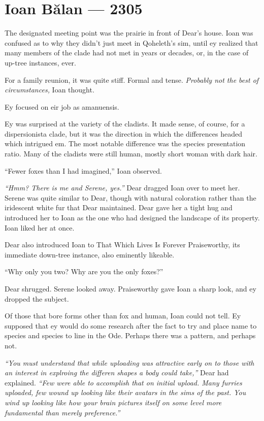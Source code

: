 \hypertarget{ioan-bux103lan-2305}{%
\chapter*{Ioan Bălan — 2305}\label{ioan-bux103lan-2305}}

The designated meeting point was the prairie in front of Dear's house. Ioan was confused as to why they didn't just meet in Qoheleth's sim, until ey realized that many members of the clade had not met in years or decades, or, in the case of up-tree instances, ever.

For a family reunion, it was quite stiff. Formal and tense. \emph{Probably not the best of circumstances,} Ioan thought.

Ey focused on eir job as amanuensis.

Ey was surprised at the variety of the cladists. It made sense, of course, for a dispersionista clade, but it was the direction in which the differences headed which intrigued em. The most notable difference was the species presentation ratio. Many of the cladists were still human, mostly short woman with dark hair.

``Fewer foxes than I had imagined,'' Ioan observed.

\emph{``Hmm? There is me and Serene, yes.''} Dear dragged Ioan over to meet her. Serene was quite similar to Dear, though with natural coloration rather than the iridescent white fur that Dear maintained. Dear gave her a tight hug and introduced her to Ioan as the one who had designed the landscape of its property. Ioan liked her at once.

Dear also introduced Ioan to That Which Lives Is Forever Praiseworthy, its immediate down-tree instance, also eminently likeable.

``Why only you two? Why are you the only foxes?''

Dear shrugged. Serene looked away. Praiseworthy gave Ioan a sharp look, and ey dropped the subject.

Of those that bore forms other than fox and human, Ioan could not tell. Ey supposed that ey would do some research after the fact to try and place name to species and species to line in the Ode. Perhaps there was a pattern, and perhaps not.

\emph{``You must understand that while uploading was attractive early on to those with an interest in explroing the differen shapes a body could take,''} Dear had explained. \emph{``Few were able to accomplish that on initial upload. Many furries uploaded, few wound up looking like their avatars in the sims of the past. You wind up looking like how your brain pictures itself on some level more fundamental than merely preference.''}

